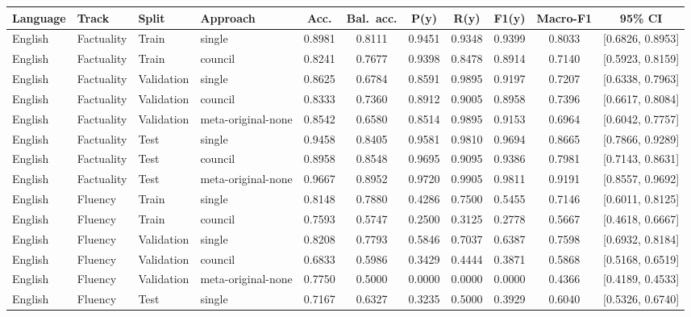 \begin{tabular}{llllccccccc}
\hline
\textbf{Language} & \textbf{Track} & \textbf{Split} & \textbf{Approach} & \textbf{Acc.} & \textbf{Bal.\ acc.} & \textbf{P(y)} & \textbf{R(y)} & \textbf{F1(y)} & \textbf{Macro-F1} & \textbf{95\% CI} \\
\hline
English & Factuality & Train & single & 0.8981 & 0.8111 & 0.9451 & 0.9348 & 0.9399 & 0.8033 & [0.6826, 0.8953] \\
English & Factuality & Train & council & 0.8241 & 0.7677 & 0.9398 & 0.8478 & 0.8914 & 0.7140 & [0.5923, 0.8159] \\
English & Factuality & Validation & single & 0.8625 & 0.6784 & 0.8591 & 0.9895 & 0.9197 & 0.7207 & [0.6338, 0.7963] \\
English & Factuality & Validation & council & 0.8333 & 0.7360 & 0.8912 & 0.9005 & 0.8958 & 0.7396 & [0.6617, 0.8084] \\
English & Factuality & Validation & meta-original-none & 0.8542 & 0.6580 & 0.8514 & 0.9895 & 0.9153 & 0.6964 & [0.6042, 0.7757] \\
English & Factuality & Test & single & 0.9458 & 0.8405 & 0.9581 & 0.9810 & 0.9694 & 0.8665 & [0.7866, 0.9289] \\
English & Factuality & Test & council & 0.8958 & 0.8548 & 0.9695 & 0.9095 & 0.9386 & 0.7981 & [0.7143, 0.8631] \\
English & Factuality & Test & meta-original-none & 0.9667 & 0.8952 & 0.9720 & 0.9905 & 0.9811 & 0.9191 & [0.8557, 0.9692] \\
English & Fluency & Train & single & 0.8148 & 0.7880 & 0.4286 & 0.7500 & 0.5455 & 0.7146 & [0.6011, 0.8125] \\
English & Fluency & Train & council & 0.7593 & 0.5747 & 0.2500 & 0.3125 & 0.2778 & 0.5667 & [0.4618, 0.6667] \\
English & Fluency & Validation & single & 0.8208 & 0.7793 & 0.5846 & 0.7037 & 0.6387 & 0.7598 & [0.6932, 0.8184] \\
English & Fluency & Validation & council & 0.6833 & 0.5986 & 0.3429 & 0.4444 & 0.3871 & 0.5868 & [0.5168, 0.6519] \\
English & Fluency & Validation & meta-original-none & 0.7750 & 0.5000 & 0.0000 & 0.0000 & 0.0000 & 0.4366 & [0.4189, 0.4533] \\
English & Fluency & Test & single & 0.7167 & 0.6327 & 0.3235 & 0.5000 & 0.3929 & 0.6040 & [0.5326, 0.6740] \\

\end{tabular}
